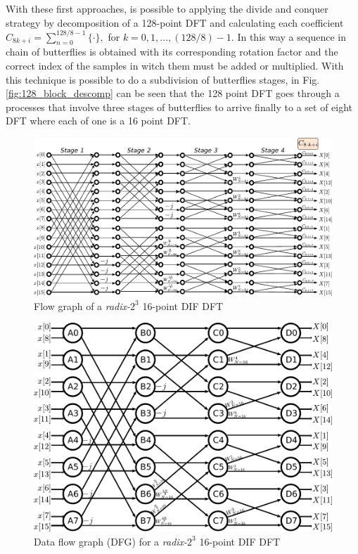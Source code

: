 \documentclass[journal,comsoc]{IEEEtran}
\begin{document}
With these first approaches, is possible to applying the divide and conquer strategy by decomposition of a 128-point DFT and calculating each coefficient $C_{8k+i} = \sum_{n=0}^{128/8-1} \{ \cdot \}, $ for $k=0,1,...,(128/8)-1$. In this way a sequence in chain of butterflies is obtained with its corresponding rotation factor and the correct index of the samples in witch them must be added or multiplied. With this technique is possible to do a subdivision of butterflies stages, in Fig. \ref{fig:128_block_descomp} can be seen that the 128 point DFT goes through a processes that involve three stages of butterflies to arrive finally to a set of eight DFT where each of one is a 16 point DFT.


\begin{figure} 
	\centering
	\includegraphics[width=\linewidth]{Diagramas/miSeccionFiguras/16PuntosRadix8Conexion.pdf}
	\caption{Flow graph of a \textit{radix-}$2^3$ 16-point DIF DFT}
	\label{fig:16points_df}
\end{figure}

\begin{figure} 
	\centering
	\includegraphics[width=\linewidth]{Diagramas/miSeccionFiguras/16PuntosRadix8Burbujas.pdf}
	\caption{Data flow graph (DFG) for a \textit{radix-}$2^3$ 16-point DIF DFT}
	\label{fig:16points_dfg}
\end{figure}
\end{document}
